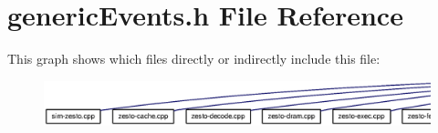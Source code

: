 \section{genericEvents.h File Reference}
\label{genericEvents_8h}


This graph shows which files directly or indirectly include this file:\nopagebreak
\begin{figure}[H]
\begin{center}
\leavevmode
\includegraphics[width=420pt]{genericEvents_8h__dep__incl}
\end{center}
\end{figure}
